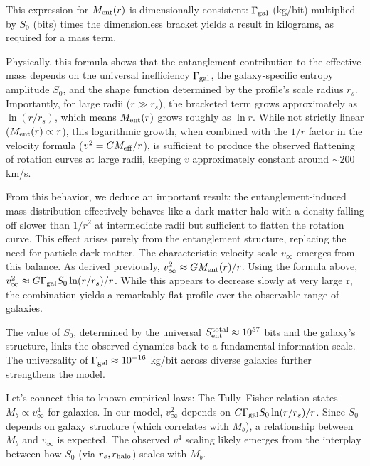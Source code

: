 \documentclass[11pt]{article}
\begin{document}
This expression for $M_{\rm ent}(r)$ is dimensionally consistent: $\Gamma_{\rm gal}$ (kg/bit) multiplied by $S_0$ (bits) times the dimensionless bracket yields a result in kilograms, as required for a mass term.

Physically, this formula shows that the entanglement contribution to the effective mass depends on the universal inefficiency $\Gamma_{\rm gal}$, the galaxy-specific entropy amplitude $S_0$, and the shape function determined by the profile's scale radius $r_s$. Importantly, for large radii ($r \gg r_s$), the bracketed term grows approximately as $\ln(r/r_s)$, which means $M_{\rm ent}(r)$ grows roughly as $\ln r$. While not strictly linear ($M_{\rm ent}(r) \propto r$), this logarithmic growth, when combined with the $1/r$ factor in the velocity formula ($v^2=GM_{\rm eff}/r$), is sufficient to produce the observed flattening of rotation curves at large radii, keeping $v$ approximately constant around $\sim 200$ km/s.

From this behavior, we deduce an important result: the entanglement-induced mass distribution effectively behaves like a dark matter halo with a density falling off slower than $1/r^2$ at intermediate radii but sufficient to flatten the rotation curve. This effect arises purely from the entanglement structure, replacing the need for particle dark matter. The characteristic velocity scale $v_\infty$ emerges from this balance. As derived previously, $v_\infty^2 \approx G M_{\rm ent}(r) / r$. Using the formula above, $v_\infty^2 \approx G \Gamma_{\rm gal} S_0 \ln(r/r_s) / r$. While this appears to decrease slowly at very large r, the combination yields a remarkably flat profile over the observable range of galaxies.

The value of $S_0$, determined by the universal $S_{\rm ent}^{\rm total} \approx 10^{57}$ bits and the galaxy's structure, links the observed dynamics back to a fundamental information scale. The universality of $\Gamma_{\rm gal} \approx 10^{-16}$ kg/bit across diverse galaxies further strengthens the model.

Let’s connect this to known empirical laws: The Tully–Fisher relation states $M_b \propto v_\infty^4$ for galaxies. In our model, $v_\infty^2$ depends on $G \Gamma_{\rm gal} S_0 \ln(r/r_s)/r$. Since $S_0$ depends on galaxy structure (which correlates with $M_b$), a relationship between $M_b$ and $v_\infty$ is expected. The observed $v^4$ scaling likely emerges from the interplay between how $S_0$ (via $r_s, r_{\rm halo}$) scales with $M_b$.
\end{document}
